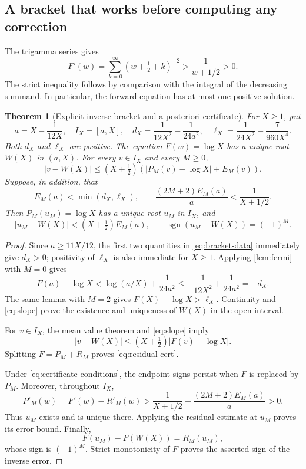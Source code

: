 \documentclass[11pt,a4paper]{article}
\newtheorem{theorem}{Theorem}[section]
\theoremstyle{definition}
\numberwithin{equation}{section}
\begin{document}
\subsection{A bracket that works before computing any correction}
The trigamma series gives
\begin{equation}
 F'(w)=\sum_{k=0}^\infty(w+\tfrac12+k)^{-2}
       >\frac1{w+1/2}>0.
 \label{eq:slope}
\end{equation}
The strict inequality follows by comparison with the integral of the decreasing summand. In particular, the forward equation has at most one positive solution.

\begin{theorem}[Explicit inverse bracket and a posteriori certificate]
\label{thm:cert}
For $X\ge1$, put
\begin{equation}
 a=X-\frac1{12X},\quad I_X=[a,X],\quad
 d_X=\frac1{12X^2}-\frac1{24a^2},\quad
 \ell_X=\frac1{24X^2}-\frac7{960X^4}.
 \label{eq:bracket-data}
\end{equation}
Both $d_X$ and $\ell_X$ are positive. The equation $F(w)=\log X$ has a unique root $W(X)$ in $(a,X)$. For every $v\in I_X$ and every $M\ge0$,
\begin{equation}
 |v-W(X)|\le (X+\tfrac12)
 \left(\left|P_M(v)-\log X\right|+E_M(v)\right).
 \label{eq:residual-cert}
\end{equation}
Suppose, in addition, that
\begin{equation}
 E_M(a)<\min(d_X,\ell_X),\qquad
 \frac{(2M+2)E_M(a)}a<\frac1{X+1/2}.
 \label{eq:certificate-conditions}
\end{equation}
Then $P_M(u_M)=\log X$ has a unique root $u_M$ in $I_X$, and
\begin{equation}
 |u_M-W(X)|<(X+\tfrac12)E_M(a),\qquad
 \operatorname{sgn}(u_M-W(X))=(-1)^M.
 \label{eq:uM-cert}
\end{equation}
\end{theorem}
\begin{proof}
Since $a\ge11X/12$, the first two quantities in \eqref{eq:bracket-data} immediately give $d_X>0$; positivity of $\ell_X$ is also immediate for $X\ge1$. Applying \cref{lem:fermi} with $M=0$ gives
\[
 F(a)-\log X<\log(a/X)+\frac1{24a^2}
 \le-\frac1{12X^2}+\frac1{24a^2}=-d_X.
\]
The same lemma with $M=2$ gives $F(X)-\log X>\ell_X$. Continuity and \eqref{eq:slope} prove the existence and uniqueness of $W(X)$ in the open interval.

For $v\in I_X$, the mean value theorem and \eqref{eq:slope} imply
\[
 |v-W(X)|\le(X+\tfrac12)|F(v)-\log X|.
\]
Splitting $F=P_M+R_M$ proves \eqref{eq:residual-cert}.

Under \eqref{eq:certificate-conditions}, the endpoint signs persist when $F$ is replaced by $P_M$. Moreover, throughout $I_X$,
\[
 P'_M(w)=F'(w)-R'_M(w)
 >\frac1{X+1/2}-\frac{(2M+2)E_M(a)}a>0.
\]
Thus $u_M$ exists and is unique there. Applying the residual estimate at $u_M$ proves its error bound. Finally,
\[
 F(u_M)-F(W(X))=R_M(u_M),
\]
whose sign is $(-1)^M$. Strict monotonicity of $F$ proves the asserted sign of the inverse error.
\end{proof}
\end{document}
